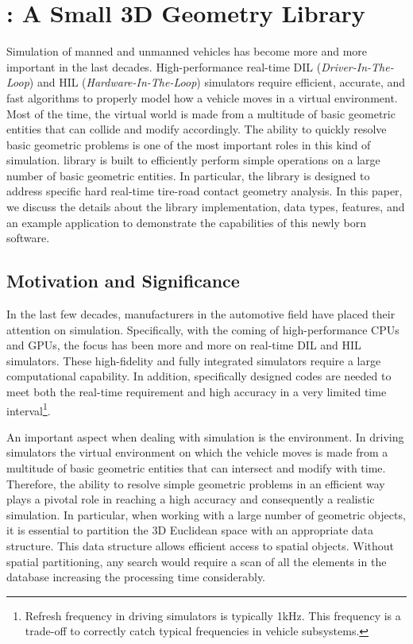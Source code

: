 
\chapter{\Acme{}: A Small 3D Geometry Library}
\label{appendix:acme}

Simulation of manned and unmanned vehicles has become more and more important in the last decades. High-performance real-time DIL (\emph{Driver-In-The-Loop}) and HIL (\emph{Hardware-In-The-Loop}) simulators require efficient, accurate, and fast algorithms to properly model how a vehicle moves in a virtual environment. Most of the time, the virtual world is made from a multitude of basic geometric entities that can collide and modify accordingly. The ability to quickly resolve basic geometric problems is one of the most important roles in this kind of simulation. \Acme{} library is built to efficiently perform simple operations on a large number of basic geometric entities. In particular, the library is designed to address specific hard real-time tire-road contact geometry analysis. In this paper, we discuss the details about the \Acme{} library implementation, data types, features, and an example application to demonstrate the capabilities of this newly born software.


\section{Motivation and Significance}

In the last few decades, manufacturers in the automotive field have placed their attention on simulation. Specifically, with the coming of high-performance CPUs and GPUs, the focus has been more and more on real-time DIL and HIL simulators. These high-fidelity and fully integrated simulators require a large computational capability. In addition, specifically designed codes are needed to meet both the real-time requirement and high accuracy in a very limited time interval\footnote{Refresh frequency in driving simulators is typically 1kHz. This frequency is a trade-off to correctly catch typical frequencies in vehicle subsystems.}.

An important aspect when dealing with simulation is the environment. In driving simulators the virtual environment on which the vehicle moves is made from a multitude of basic geometric entities that can intersect and modify with time. Therefore, the ability to resolve simple geometric problems in an efficient way plays a pivotal role in reaching a high accuracy and consequently a realistic simulation. In particular, when working with a large number of geometric objects, it is essential to partition the 3D Euclidean space with an appropriate data structure. This data structure allows efficient access to spatial objects. Without spatial partitioning, any search would require a scan of all the elements in the database increasing the processing time considerably.

